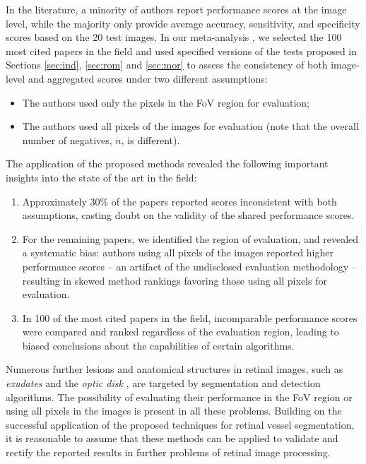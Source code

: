 \documentclass[3p, times]{elsarticle}
\begin{document}
{\color{blue}
In the literature, a minority of authors report performance scores at the image level, while the majority only provide average accuracy, sensitivity, and specificity scores based on the 20 test images. 
In our meta-analysis \cite{vessel}, we selected the 100 most cited papers in the field and used specified versions of the tests proposed in Sections \ref{sec:ind}, \ref{sec:rom} and \ref{sec:mor} to assess the consistency of both image-level and aggregated scores under two different assumptions: 
\begin{itemize}
    \item The authors used only the pixels in the FoV region for evaluation;
    \item The authors used all pixels of the images for evaluation (note that the overall number of negatives, $n$, is different). 
\end{itemize}
The application of the proposed methods revealed the following important insights into the state of the art in the field:
\begin{enumerate}
    \item Approximately 30\% of the papers reported scores inconsistent with both assumptions, casting doubt on the validity of the shared performance scores.
    \item For the remaining papers, we identified the region of evaluation, and revealed a systematic bias: authors using all pixels of the images reported higher performance scores -- an artifact of the undisclosed evaluation methodology -- resulting in skewed method rankings favoring those using all pixels for evaluation. 
    \item In 100 of the most cited papers in the field, incomparable performance scores were compared and ranked regardless of the evaluation region, leading to biased conclusions about the capabilities of certain algorithms.
\end{enumerate}
}

Numerous further lesions and anatomical structures in retinal images, such as \emph{exudates} \cite{exu} and the \emph{optic disk} \cite{od}, are targeted by segmentation and detection algorithms. The possibility of evaluating their performance in the FoV region or using all pixels in the images is present in all these problems. Building on the successful application of the proposed techniques for retinal vessel segmentation, it is reasonable to assume that these methods can be applied to validate and rectify the reported results in further problems of retinal image processing.
\end{document}
